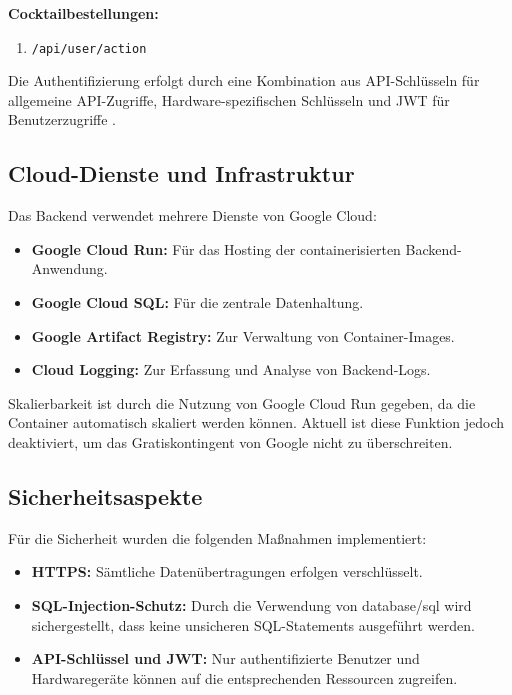 \vspace{0.5cm}
\textbf{Cocktailbestellungen:}
\begin{enumerate}
  \item \texttt{/api/user/action}
\end{enumerate}

Die Authentifizierung erfolgt durch eine Kombination aus API-Schlüsseln für allgemeine API-Zugriffe, 
Hardware-spezifischen Schlüsseln und JWT für Benutzerzugriffe .

\subsection{Cloud-Dienste und Infrastruktur}

Das Backend verwendet mehrere Dienste von Google Cloud:
\begin{itemize}
	\item \textbf{\textcolor{red7}{Google Cloud Run:}} Für das Hosting der containerisierten Backend-Anwendung\cite{googlecloudrun}.
	\item \textbf{\textcolor{red7}{Google Cloud SQL:}} Für die zentrale Datenhaltung\cite{googlecloudsql}.
	\item \textbf{\textcolor{red7}{Google Artifact Registry:}} Zur Verwaltung von Container-Images\cite{googleartifactregistry}.
	\item \textbf{\textcolor{red7}{Cloud Logging:}} Zur Erfassung und Analyse von Backend-Logs\cite{googlecloudlogging}.
\end{itemize}

Skalierbarkeit ist durch die Nutzung von Google Cloud Run gegeben, da die Container automatisch 
skaliert werden können. Aktuell ist diese Funktion jedoch deaktiviert, um das Gratiskontingent von 
Google nicht zu überschreiten.


\subsection{Sicherheitsaspekte}

Für die Sicherheit wurden die folgenden Maßnahmen implementiert:
\begin{itemize}
	\item \textbf{\textcolor{red7}{HTTPS:}} Sämtliche Datenübertragungen erfolgen verschlüsselt.
	\item \textbf{\textcolor{red7}{SQL-Injection-Schutz:}} Durch die Verwendung von database/sql wird sichergestellt, dass keine 
unsicheren SQL-Statements ausgeführt werden.
	\item \textbf{\textcolor{red7}{API-Schlüssel und JWT:}} Nur authentifizierte Benutzer und Hardwaregeräte können auf die 
entsprechenden Ressourcen zugreifen.
\end{itemize}


